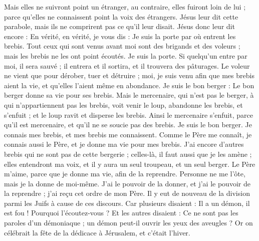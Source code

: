 \begin{multicols}{2}
Mais elles ne suivront point un étranger, au contraire, elles fuiront loin de lui ; parce qu'elles ne connaissent point la voix des étrangers.
Jésus leur dit cette parabole, mais ils ne comprirent pas ce qu'il leur disait.
Jésus donc leur dit encore : En vérité, en vérité, je vous dis : Je suis la porte par où entrent les brebis.
Tout ceux qui sont venus avant moi sont des brigands et des voleurs ; mais les brebis ne les ont point écoutés.
Je suis la porte. Si quelqu'un entre par moi, il sera sauvé ; il entrera et il sortira, et il trouvera des pâturages.
Le voleur ne vient que pour dérober, tuer et détruire ; moi, je suis venu afin que mes brebis aient la vie, et qu'elles l'aient même en abondance.
Je suis le bon berger : Le bon berger donne sa vie pour ses brebis.
Mais le mercenaire, qui n'est pas le berger, à qui n'appartiennent pas les brebis, voit venir le loup, abandonne les brebis, et s'enfuit ; et le loup ravit et disperse les brebis.
Ainsi le mercenaire s'enfuit, parce qu'il est mercenaire, et qu'il ne se soucie pas des brebis. Je suis le bon berger.
Je connais mes brebis, et mes brebis me connaissent.
Comme le Père me connaît, je connais aussi le Père, et je donne ma vie pour mes brebis.
J'ai encore d'autres brebis qui ne sont pas de cette bergerie ; celles-là, il faut aussi que je les amène ; elles entendront ma voix, et il y aura un seul troupeau, et un seul berger.
Le Père m'aime, parce que je donne ma vie, afin de la reprendre.
Personne ne me l'ôte, mais je la donne de moi-même. J'ai le pouvoir de la donner, et j'ai le pouvoir de la reprendre ; j'ai reçu cet ordre de mon Père.
Il y eut de nouveau de la division parmi les Juifs à cause de ces discours.
Car plusieurs disaient : Il a un démon, il est fou ! Pourquoi l'écoutez-vous ?
Et les autres disaient : Ce ne sont pas les paroles d'un démoniaque ; un démon peut-il ouvrir les yeux des aveugles ?
Or on célébrait la fête de la dédicace à Jérusalem, et c'était l'hiver.

\end{multicols}
